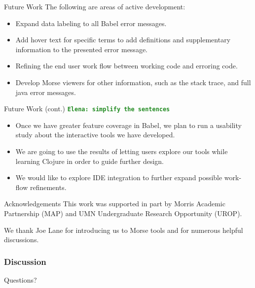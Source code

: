 \documentclass{beamer}
\newcommand{\comment}[1]{{\bf \tt  {#1}}}
\newcommand{\emcomment}[1]{\textcolor{ForestGreen}{\comment{Elena: {#1}}}}
\begin{document}
\begin{frame}{Future Work}
  The following are areas of active development:
  \begin{itemize}
    \item<1-> Expand data labeling to all Babel error messages.
    \item<2-> Add hover text for specific terms to add definitions and supplementary information to the presented error message.
    \item<3-> Refining the end user work flow between working code and erroring code.
    \item<4-> Develop Morse viewers for other information, such as the stack trace, and full java error messages.
  \end{itemize}
  \end{frame}

\begin{frame}{Future Work (cont.)}
\emcomment{simplify the sentences}
  \begin{itemize}
    \item<1-> Once we have greater feature coverage in Babel, we plan to run a usability study about the interactive tools we have developed.
    \item<2-> We are going to use the results of letting users explore our tools while learning Clojure in order to guide further design. 
    \item<3-> We would like to explore IDE integration to further expand possible work-flow refinements.
  \end{itemize}
\end{frame}

\begin{frame}{Acknowledgements}
This work was supported in part by Morris Academic Partnership (MAP) and UMN Undergraduate Research Opportunity (UROP).  \\ 

\vspace*{0.2in}

We thank Joe Lane for introducing us to Morse tools and for numerous helpful discussions.
\end{frame}

\begin{frame}
  \frametitle{Discussion}
Questions?
\end{frame}
\end{document}
